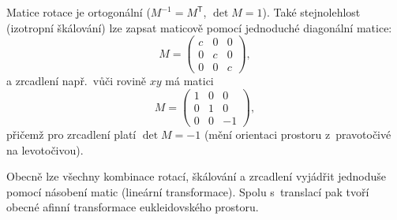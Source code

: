 Matice rotace je ortogonální ($M^{-1} = M^\mathsf{T}$, $\det M = 1$).
Také stejnolehlost (izotropní škálování) lze zapsat maticově pomocí jednoduché diagonální matice:
$$ M = \begin{pmatrix}
    c & 0 & 0\\
    0 & c & 0\\
    0 & 0 & c
\end{pmatrix}, $$
a zrcadlení např.~vůči rovině $xy$ má matici
$$ M=\begin{pmatrix}
    1 & 0 & 0\\
    0 & 1 & 0\\
    0 & 0 & -1
\end{pmatrix}, $$
přičemž pro zrcadlení platí $\det M = -1$ (mění orientaci prostoru z~pravotočivé na levotočivou).

Obecně lze všechny kombinace rotací, škálování a zrcadlení vyjádřit jednoduše pomocí násobení matic (lineární transformace). Spolu s~translací pak tvoří obecné afinní transformace eukleidovského prostoru.